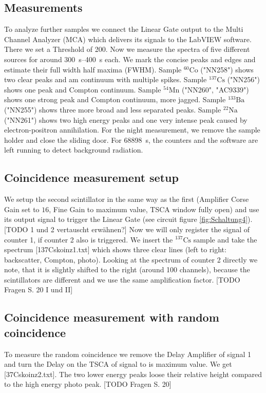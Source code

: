\subsection{Measurements}
%
To analyze further samples we connect the Linear Gate output to the Multi Channel Analyzer (MCA) which delivers its signals to the LabVIEW software.
There we set a Threshold of 200.
%
Now we measure the spectra of five different sources for around \SIrange{300}{400}{\second} each.
We mark the concise peaks and edges and estimate their full width half maxima (FWHM).
%
Sample $^{60}\text{Co}$ ("NN258") shows two clear peaks and am continuum with multiple spikes.
Sample $^{137}\text{Cs}$ ("NN256") shows one peak and Compton continuum.
Sample $^{54}\text{Mn}$ ("NN260", "AC9339") shows one strong peak and Compton continuum, more jagged.
Sample $^{133}\text{Ba}$ ("NN255") shows three more broad and less separated peaks.
Sample $^{22}\text{Na}$ ("NN261") shows two high energy peaks and one very intense peak caused by electron-positron annihilation.
%
For the night measurement, we remove the sample holder and close the sliding door.
For \SI{68898}{\second}, the counters and the software are left running to detect background radiation.
%
\subsection{Coincidence measurement setup}
%
We setup the second scintillator in the same way as the first (Amplifier Corse Gain set to $16$, Fine Gain to maximum value, TSCA window fully open) and use its output signal to trigger the Linear Gate (see circuit figure \ref{fig:Schaltung4}).
[TODO 1 und 2 vertauscht erwähnen?]
Now we will only register the signal of counter 1, if counter 2 also is triggered.
%
We insert the $^{137}\text{Cs}$ sample and take the spectrum [137Cskoinz1.txt] which shows three clear lines (left to right: backscatter, Compton, photo).
%
Looking at the spectrum of counter 2 directly we note, that it is slightly shifted to the right (around 100 channels), because the scintillators are different and we use the same amplification factor.
[TODO Fragen S. 20 I und II]
%
\subsection{Coincidence measurement with random coincidence}
%
To measure the random coincidence we remove the Delay Amplifier of signal 1 and turn the Delay on the TSCA of signal to is maximum value.
We get [37Cskoinz2.txt].
The two lower energy peaks loose their relative height compared to the high energy photo peak.
[TODO Fragen S. 20]
%
